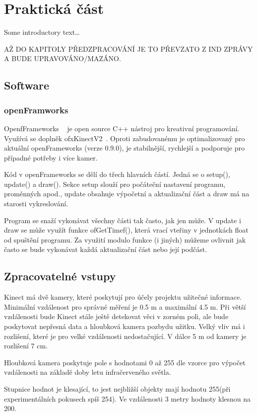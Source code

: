 \chapter{Praktická část}
Some introductory text\dots

AŽ DO KAPITOLY PŘEDZPRACOVÁNÍ JE TO PŘEVZATO Z IND ZPRÁVY A BUDE UPRAVOVÁNO/MAZÁNO.

\section{Software}
\subsection{openFramworks}
OpenfFrameworks ~\cite{1} je open source C++ nástroj pro kreativní programování.\\
Využívá se doplněk ofxKinectV2~\cite{2}. Oproti zabudovanému  je optimalizovaný pro aktuální openFrameworks (verze 0.9.0), je stabilnější, rychlejší a podporuje pro případné potřeby i více kamer.

Kód v openFrameworks se dělí do třech hlavních částí. Jedná se o setup(), update() a draw(). Sekce setup slouží pro počáteční nastavení programu, proměnných apod., update obsahuje výpočetní a aktualizační část a draw má na starosti vykreslování.

Program se snaží vykonávat všechny části tak často, jak jen může. V update i draw se může využít funkce ofGetTimef(), která vrací vteřiny v jednotkách float od spuštění programu. Za využití modulo funkce (i jiných) můžeme ovlivnit jak často se bude vykonávat každá aktualizační část nebo její podčást.

\section{Zpracovatelné vstupy}

Kinect má dvě kamery, které poskytují pro účely projektu užitečné informace. Minimální vzdálenost pro správné měření je 0.5 m a maximální 4.5 m. Při větší vzdálenosti bude Kinect stále ještě detekovat věci v zorném poli, ale bude poskytovat nepřesná data a hloubková kamera pozbydu užitku. Velký vliv má i rozlišení, které je pro velké vzdálenosti nedostačující. V dálce 5 m od kamery je rozlišení 7 cm.

Hloubková kamera poskytuje pole s hodnotami 0 až 255 dle vzorce pro výpočet vzdálenosti na základě doby letu infračerveného světla.

Stupnice hodnot je klesající, to jest nejbližší objekty mají hodnotu 255(při experimentálních pokusech spíš 254). Ve vzdálenosti 3 metry hodnoty klesnou na 200. 

